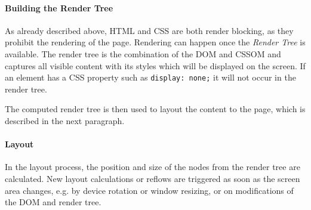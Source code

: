 










\paragraph{Building the Render Tree}


As already described above, HTML and CSS are both render blocking, as they prohibit the rendering of the page.
Rendering can happen once the \textit{Render Tree} is available.
The render tree is the combination of the DOM and CSSOM and captures all visible content with its styles which will be displayed on the screen.
If an element has a CSS property such as \verb|display: none;| it will not occur in the render tree. %

The computed render tree is then used to layout the content to the page, which is described in the next paragraph.








\paragraph{Layout}



In the layout process, the position and size of the nodes from the render tree are calculated.
New layout calculations or reflows are triggered as soon as the screen area changes, e.g. by device rotation or window resizing, or on modifications of the DOM and render tree. %

